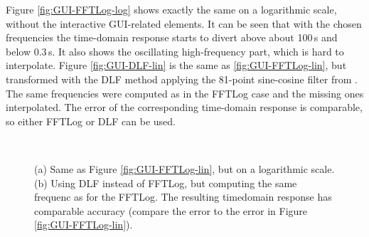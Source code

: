 \documentclass[extra, camera,%
    final,       %
]{gji}
\newlength{\fwidth}
\begin{document}
Figure \ref{fig:GUI-FFTLog-log} shows exactly the same on a logarithmic scale,
without the interactive GUI-related elements. It can be seen that with the
chosen frequencies the time-domain response starts to divert above about 100\,s
and below 0.3\,s. It also shows the oscillating high-frequency part, which is
hard to interpolate. Figure
\ref{fig:GUI-DLF-lin} is the same as  \ref{fig:GUI-FFTLog-lin},
but transformed with the DLF method applying the 81-point sine-cosine filter
from \cite{GEO.09.Key}. The same frequencies were computed as in the FFTLog
case and the missing ones interpolated. The error of the corresponding
time-domain response is comparable, so either FFTLog or DLF can be used.
%
\begin{figure}
  \centering
  \hfill
  \\
  \caption{(a) Same as Figure \ref{fig:GUI-FFTLog-lin}, but on a logarithmic
  scale. (b) Using DLF instead of FFTLog, but computing the same
  frequenc as for the FFTLog. The resulting
  time\replaced{-}{ }domain response has comparable accuracy (compare the error
  to the error in Figure \ref{fig:GUI-FFTLog-lin}).}
  \label{fig:GUI-log-lin}
\end{figure}
\end{document}
